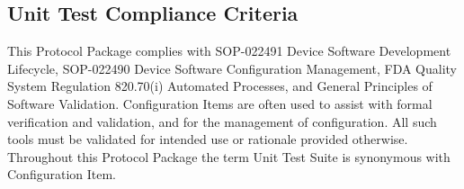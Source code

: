\subsection{Unit Test Compliance Criteria}
This Protocol Package complies with SOP-022491 Device Software Development
Lifecycle, SOP-022490 Device Software Configuration Management, FDA Quality
System Regulation 820.70(i) Automated Processes, and General Principles of
Software Validation.  Configuration Items are often used to assist with formal
verification and validation, and for the management of configuration.  All such
tools must be validated for intended use or rationale provided otherwise.
Throughout this Protocol Package the term Unit Test Suite is synonymous with
Configuration Item.
